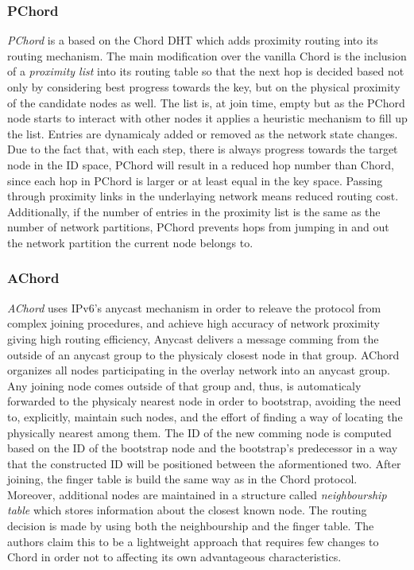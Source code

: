 \subsubsection{PChord}
\emph{PChord}\cite{hong_pchord_2005} is a based on the Chord DHT which adds
proximity routing into its routing mechanism. The main modification over the
vanilla Chord is the inclusion of a \emph{proximity list} into its routing table
so that the next hop is decided based not only by considering best progress
towards the key, but on the physical proximity of the candidate nodes as well.
The list is, at join time, empty but as the PChord node starts to interact with
other nodes it applies a heuristic mechanism to fill up the list. Entries are
dynamicaly added or removed as the network state changes. Due to the fact that,
with each step, there is always progress towards the target node in the ID
space, PChord will result in a reduced hop number than Chord, since each hop in
PChord is larger or at least equal in the key space. Passing through proximity
links in the underlaying network means reduced routing cost. Additionally, if
the number of entries in the proximity list is the same as the number of network
partitions, PChord prevents hops from jumping in and out the network partition
the current node belongs to.

\subsubsection{AChord}
\emph{AChord} \cite{dao_achord_2006} uses IPv6's anycast mechanism in order to
releave the protocol from complex joining procedures, and achieve high accuracy
of network proximity giving high routing efficiency, Anycast delivers a message
comming from the outside of an anycast group to the physicaly closest node in
that group. AChord organizes all nodes participating in the overlay network into
an anycast group. Any joining node comes outside of that group and, thus, is
automaticaly forwarded to the physicaly nearest node in order to bootstrap,
avoiding the need to, explicitly, maintain such nodes, and the effort of finding
a way of locating the physically nearest among them. The ID of the new comming
node is computed based on the ID of the bootstrap node and the bootstrap's
predecessor in a way that the constructed ID will be positioned between the
aformentioned two. After joining, the finger table is build the same way as in
the Chord protocol. Moreover, additional nodes are maintained in a structure
called \emph{neighbourship table} which stores information about the closest
known node. The routing decision is made by using both the neighbourship and
the finger table. The authors claim this to be a lightweight approach that
requires few changes to Chord in order not to affecting its own advantageous
characteristics.


